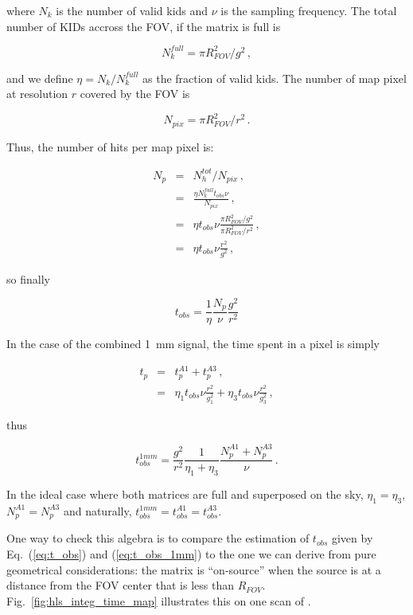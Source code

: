 \noindent where $N_k$ is the number of valid kids and $\nu$ is the sampling frequency. The
total number of KIDs accross the FOV, if the matrix is full is

\begin{equation}
N_k^{full} = \pi R_{FOV}^2/g^2\, ,
\end{equation}

\noindent and we define $\eta = N_k/N_k^{full}$ as the fraction of valid kids. The number
of map pixel at resolution $r$ covered by the FOV is

\begin{equation}
N_{pix} = \pi R_{FOV}^2/r^2\, .
\end{equation}

Thus, the number of hits per map pixel is:

\begin{eqnarray}
N_p &=& N_h^{tot}/N_{pix}\,, \nonumber\\
 &=& \frac{\eta N_k^{full} t_{obs} \nu}{N_{pix}}\,, \nonumber\\
&=& \eta t_{obs}\nu \frac{\pi R_{FOV}^2/g^2}{\pi R_{FOV}^2/r^2}\,, \nonumber\\
&=& \eta t_{obs}\nu \frac{r^2}{g^2}\,, \nonumber
\end{eqnarray}

so finally

\begin{equation}
t_{obs} = \frac{1}{\eta}\frac{N_p}{\nu}\frac{g^2}{r^2}
\label{eq:t_obs}
\end{equation}

In the case of the combined 1~mm signal, the time spent in a pixel is simply

\begin{eqnarray}
t_p &=& t_p^{A1} + t_p^{A3}\,, \nonumber\\
&=&\eta_1 t_{obs}\nu \frac{r^2}{g_1^2} + \eta_3 t_{obs}\nu \frac{r^2}{g_3^2}\,, \nonumber
\end{eqnarray}

thus

\begin{equation}
t_{obs}^{1mm} =
\frac{g^2}{r^2}\frac{1}{\eta_1+\eta_3}\frac{N_p^{A1}+N_p^{A3}}{\nu}\,.
\label{eq:t_obs_1mm}
\end{equation}

In the ideal case where both matrices are full and superposed on the sky,
$\eta_1=\eta_3$, $N_p^{A1}=N_p^{A3}$ and naturally, $t_{obs}^{1mm} =
t_{obs}^{A1} = t_{obs}^{A3}$.

One way to check this algebra is to compare the estimation of $t_{obs}$ given by
Eq.~(\ref{eq:t_obs}) and (\ref{eq:t_obs_1mm}) to the one we can derive from pure
geometrical considerations: the matrix is ``on-source'' when the source is at a
distance from the FOV center that is less than
$R_{FOV}$. Fig.~\ref{fig:hls_integ_time_map} illustrates this on one scan of \hls.


